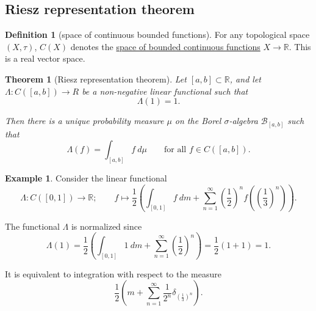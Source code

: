 \documentclass[a4paper,12pt]{scrreprt}
\newcommand{\R}{\mathbb{R}}
\newcommand{\defn}[1]{\ul{#1}}
\theoremstyle{definition}
\newtheorem{definition}{Definition}[section]
\newtheorem{example}{Example}[section]
\theoremstyle{plain}
\newtheorem{theorem}{Theorem}[section]
\theoremstyle{remark}
\begin{document}
\subsection{Riesz representation theorem}
\begin{definition}[space of continuous bounded functions]
  \label{def:spaceofboundedlinearfunctions}
  For any topological space $(X, \tau)$, $C(X)$ denotes the \defn{space of bounded continuous functions} $X \to \R$. This is a real vector space.
\end{definition}

\begin{theorem}[Riesz representation theorem]
  \label{thm:rieszrepresentationtheorem}
  Let $[a, b] \subset \R$, and let $\Lambda\colon C([a, b]) \to R$ be a non-negative linear functional such that
  \begin{equation*}
    \Lambda(1) = 1.
  \end{equation*}

  Then there is a unique probability measure $\mu$ on the Borel $\sigma$-algebra $\mathcal{B}_{[a, b]}$ such that
  \begin{equation*}
    \Lambda(f) = \int_{[a, b]} f\ d\mu\qquad\text{for all }f \in C([a, b]).
  \end{equation*}
\end{theorem}

\begin{example}
  Consider the linear functional
  \begin{equation*}
    \Lambda\colon C([0, 1]) \to \R;\qquad f \mapsto \frac{1}{2}\left( \int_{[0, 1]} f\ dm + \sum_{n=1}^{\infty} {\left( \frac{1}{2} \right)}^{n} f\left( {\left( \frac{1}{3} \right)}^{n} \right) \right).
  \end{equation*}

  The functional $\Lambda$ is normalized since
  \begin{equation*}
    \Lambda(1) = \frac{1}{2}\left( \int_{[0, 1]} 1\ dm + \sum_{n=1}^{\infty} {\left( \frac{1}{2} \right)}^{n} \right) = \frac{1}{2}\left( 1 + 1 \right) = 1.
  \end{equation*}

  It is equivalent to integration with respect to the measure
  \begin{equation*}
    \frac{1}{2}\left( m + \sum_{n=1}^{\infty} \frac{1}{2^{n}} \delta_{{\left( \frac{1}{3} \right)}^{n}} \right).
  \end{equation*}
\end{example}
\end{document}
